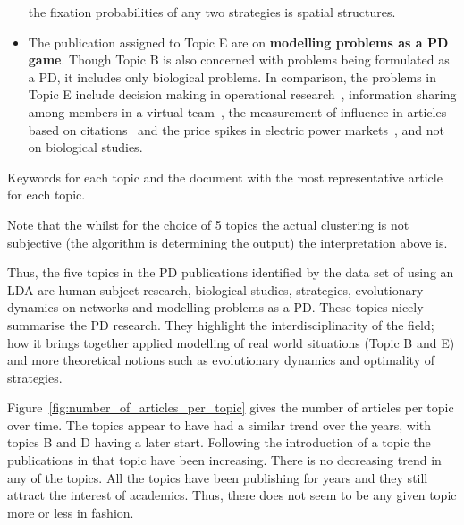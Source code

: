 \begin{itemize}
    the fixation probabilities of any two strategies is spatial
    structures.
    \item The publication assigned to Topic E are on \textbf{modelling problems
    as a PD game}. Though Topic B is also concerned with problems being formulated
    as a PD, it includes only biological problems. In comparison, the problems
    in Topic E include decision making in
    operational research~\cite{ormerod2010or}, information sharing among members
    in a virtual team~\cite{feng2008trilateral}, the measurement of influence
    in articles based on citations~\cite{hutchins2016relative} and the price
    spikes in electric power markets~\cite{Guan2002}, and not on biological studies.
\end{itemize}

\begin{table}[!hbtp]
    \begin{center}
    \resizebox{\textwidth}{!}{
    }
    \end{center}
    \caption{Keywords for each topic and the document with the most representative article for each topic.}
    \label{table:topics_and_articles}
\end{table}

Note that the whilst for the choice of 5 topics the actual clustering is not
subjective (the algorithm is determining the output) the interpretation above is.

Thus, the five topics in the PD publications identified by the data set of using an LDA
are human subject research, biological studies, strategies, evolutionary
dynamics on networks and modelling problems as a PD.
These topics nicely
summarise the PD research. They highlight the interdisciplinarity of the field;
how it brings together applied modelling of real world situations (Topic B and E)
and more theoretical notions such as evolutionary dynamics and optimality of
strategies.

Figure~\ref{fig:number_of_articles_per_topic} gives the number of articles
per topic over time. The topics appear to have had a similar trend over the years,
with topics B and D having a later start. Following the introduction of a topic
the publications in that topic have been increasing. There is no decreasing
trend in any of the topics. All the topics have been publishing for years and
they still attract the interest of academics. Thus, there does not
seem to be any given topic more or less in fashion.

